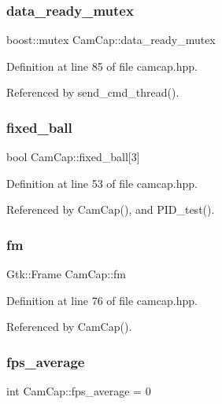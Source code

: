 \subsubsection{\texorpdfstring{data\+\_\+ready\+\_\+mutex}{data\_ready\_mutex}}
{\footnotesize\ttfamily boost\+::mutex Cam\+Cap\+::data\+\_\+ready\+\_\+mutex}



Definition at line 85 of file camcap.\+hpp.



Referenced by send\+\_\+cmd\+\_\+thread().

\mbox{\label{class_cam_cap_a19dab098186c6d30c93a68dd6b8da270}} 
\subsubsection{\texorpdfstring{fixed\+\_\+ball}{fixed\_ball}}
{\footnotesize\ttfamily bool Cam\+Cap\+::fixed\+\_\+ball\mbox{[}3\mbox{]}}



Definition at line 53 of file camcap.\+hpp.



Referenced by Cam\+Cap(), and P\+I\+D\+\_\+test().

\mbox{\label{class_cam_cap_ad0377b692fbf2edec6d8cc3dfdc65c2d}} 
\subsubsection{\texorpdfstring{fm}{fm}}
{\footnotesize\ttfamily Gtk\+::\+Frame Cam\+Cap\+::fm}



Definition at line 76 of file camcap.\+hpp.



Referenced by Cam\+Cap().

\mbox{\label{class_cam_cap_a01f1239b5e2b6478ebda3eac68c35bc1}} 
\subsubsection{\texorpdfstring{fps\+\_\+average}{fps\_average}}
{\footnotesize\ttfamily int Cam\+Cap\+::fps\+\_\+average = 0}



